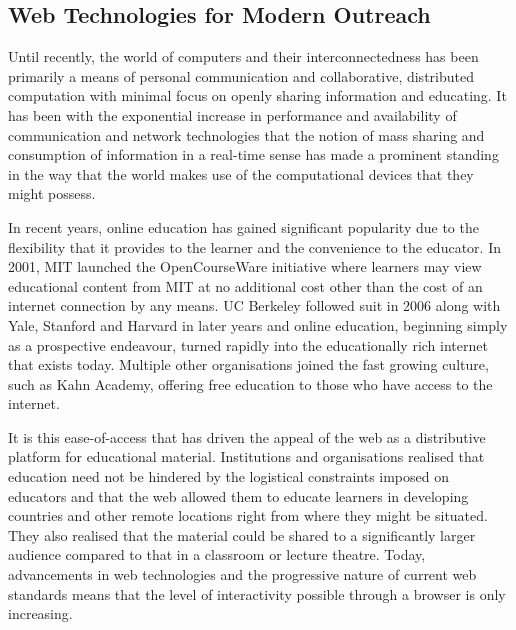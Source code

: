     \subsection{Web Technologies for Modern Outreach}
      Until recently, the world of computers and their interconnectedness has been primarily a means of personal communication and collaborative, distributed computation with minimal focus on openly sharing information and educating. It has been with the exponential increase in performance and availability of communication and network technologies that the notion of mass sharing and consumption of information in a real-time sense has made a prominent standing in the way that the world makes use of the computational devices that they might possess.
      
      In recent years, online education has gained significant popularity due to the flexibility that it provides to the learner and the convenience to the educator. In 2001, MIT launched the OpenCourseWare initiative \cite{mit2001opencourseware} where learners may view educational content from MIT at no additional cost other than the cost of an internet connection by any means. UC Berkeley followed suit in 2006 along with Yale, Stanford and Harvard in later years and online education, beginning simply as a prospective endeavour, turned rapidly into the educationally rich internet that exists today. Multiple other organisations joined the fast growing culture, such as Kahn Academy, offering free education to those who have access to the internet.
      
      It is this ease-of-access that has driven the appeal of the web as a distributive platform for educational material. Institutions and organisations realised that education need not be hindered by the logistical constraints imposed on educators and that the web allowed them to educate learners in developing countries and other remote locations right from where they might be situated. They also realised that the material could be shared to a significantly larger audience compared to that in a classroom or lecture theatre. Today, advancements in web technologies and the progressive nature of current web standards means that the level of interactivity possible through a browser is only increasing.
      
